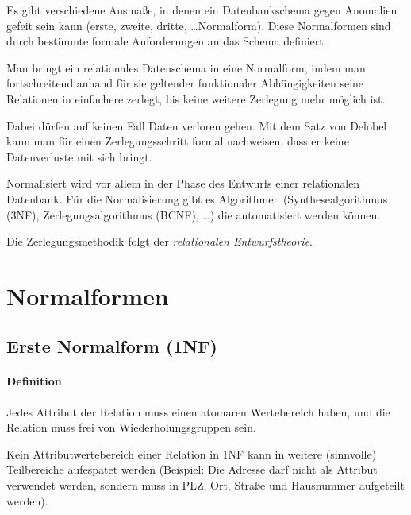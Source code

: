 \documentclass{scrbook}
\begin{document}
Es gibt verschiedene Ausmaße, in denen ein Datenbankschema gegen Anomalien
gefeit sein kann (erste, zweite, dritte, \dots Normalform).
Diese Normalformen sind durch bestimmte formale Anforderungen an das Schema definiert.

Man bringt ein relationales Datenschema in eine Normalform,
indem man fortschreitend anhand für sie geltender funktionaler Abhängigkeiten
seine Relationen in einfachere zerlegt, bis keine weitere Zerlegung mehr möglich ist.

Dabei dürfen auf keinen Fall Daten verloren gehen.
Mit dem Satz von Delobel kann man für einen Zerlegungsschritt formal nachweisen,
dass er keine Datenverluste mit sich bringt.

Normalisiert wird vor allem in der Phase des Entwurfs einer relationalen
Datenbank.  Für die Normalisierung gibt es Algorithmen (Synthesealgorithmus
(3NF), Zerlegungsalgorithmus (BCNF), \dots) die automatisiert werden können.

Die Zerlegungsmethodik folgt der \emph{relationalen Entwurfstheorie}.


\section{Normalformen}


\subsection{Erste Normalform (1NF)}

\paragraph{Definition}

\begin{definition}
Jedes Attribut der Relation muss einen atomaren Wertebereich haben,
und die Relation muss frei von Wiederholungsgruppen sein.
\end{definition}

Kein Attributwertebereich einer Relation in 1NF kann in weitere (sinnvolle)
Teilbereiche aufespatet werden 
(Beispiel: Die Adresse darf nicht als Attribut verwendet werden, sondern muss 
in PLZ, Ort, Straße und Hausnummer aufgeteilt werden).
\end{document}
